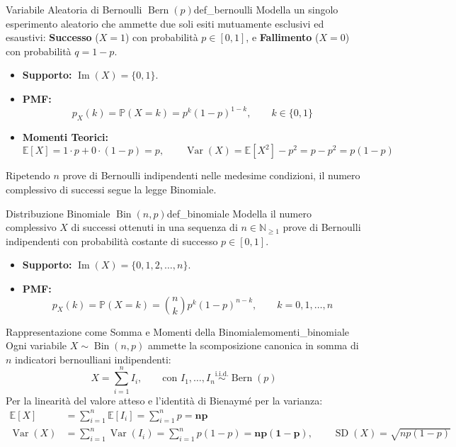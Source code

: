 \begin{definizione}{Variabile Aleatoria di Bernoulli $\operatorname{Bern}(p)$}{def_bernoulli}
Modella un singolo esperimento aleatorio che ammette due soli esiti mutuamente esclusivi ed esaustivi: \textbf{Successo} ($X=1$) con probabilità $p \in [0, 1]$, e \textbf{Fallimento} ($X=0$) con probabilità $q = 1-p$.
\begin{itemize}
    \item \textbf{Supporto:} $\operatorname{Im}(X) = \{0, 1\}$.
    \item \textbf{PMF:}
    \begin{equation}
        p_X(k) = \mathbb{P}(X = k) = p^k (1-p)^{1-k}, \qquad k \in \{0, 1\}
    \end{equation}
    \item \textbf{Momenti Teorici:}
    \begin{equation}
        \mathbb{E}[X] = 1 \cdot p + 0 \cdot (1-p) = p, \qquad \operatorname{Var}(X) = \mathbb{E}[X^2] - p^2 = p - p^2 = p(1-p)
    \end{equation}
\end{itemize}
\end{definizione}

Ripetendo $n$ prove di Bernoulli indipendenti nelle medesime condizioni, il numero complessivo di successi segue la legge Binomiale.

\begin{definizione}{Distribuzione Binomiale $\operatorname{Bin}(n, p)$}{def_binomiale}
Modella il numero complessivo $X$ di successi ottenuti in una sequenza di $n \in \mathbb{N}_{\ge 1}$ prove di Bernoulli indipendenti con probabilità costante di successo $p \in [0, 1]$.
\begin{itemize}
    \item \textbf{Supporto:} $\operatorname{Im}(X) = \{0, 1, 2, \dots, n\}$.
    \item \textbf{PMF:}
    \begin{equation}
        p_X(k) = \mathbb{P}(X = k) = \binom{n}{k} p^k (1-p)^{n-k}, \qquad k = 0, 1, \dots, n
    \end{equation}
\end{itemize}
\end{definizione}

\begin{teorema}{Rappresentazione come Somma e Momenti della Binomiale}{momenti_binomiale}
Ogni variabile $X \sim \operatorname{Bin}(n, p)$ ammette la scomposizione canonica in somma di $n$ indicatori bernoulliani indipendenti:
\begin{equation}
    X = \sum_{i=1}^n I_i, \qquad \text{con } I_1, \dots, I_n \stackrel{\text{i.i.d.}}{\sim} \operatorname{Bern}(p)
\end{equation}
Per la linearità del valore atteso e l'identità di Bienaymé per la varianza:
\begin{align}
    \mathbb{E}[X] &= \sum_{i=1}^n \mathbb{E}[I_i] = \sum_{i=1}^n p = \bm{n p} \\
    \operatorname{Var}(X) &= \sum_{i=1}^n \operatorname{Var}(I_i) = \sum_{i=1}^n p(1-p) = \bm{n p (1-p)}, \qquad \operatorname{SD}(X) = \sqrt{n p (1-p)}
\end{align}
\end{teorema}

